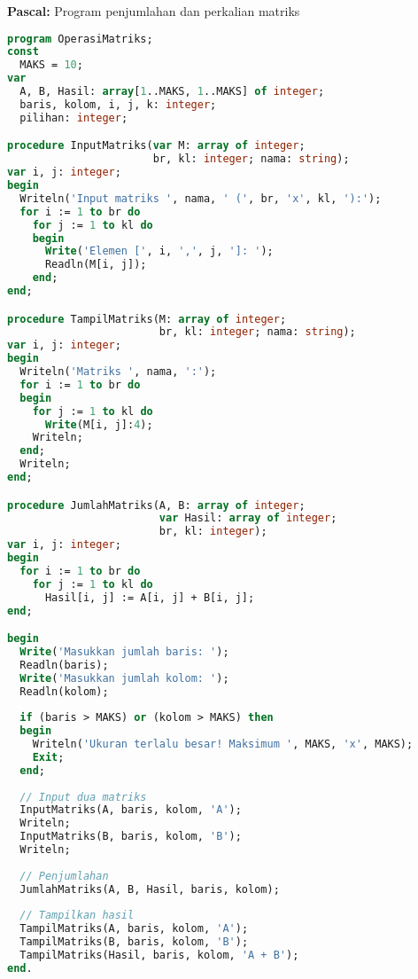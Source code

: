 \documentclass[../main.tex]{subfiles}
\begin{document}
\textbf{Pascal:} Program penjumlahan dan perkalian matriks
\begin{lstlisting}[language=Pascal, caption={Program operasi matriks di Pascal}]
program OperasiMatriks;
const
  MAKS = 10;
var
  A, B, Hasil: array[1..MAKS, 1..MAKS] of integer;
  baris, kolom, i, j, k: integer;
  pilihan: integer;

procedure InputMatriks(var M: array of integer; 
                       br, kl: integer; nama: string);
var i, j: integer;
begin
  Writeln('Input matriks ', nama, ' (', br, 'x', kl, '):');
  for i := 1 to br do
    for j := 1 to kl do
    begin
      Write('Elemen [', i, ',', j, ']: ');
      Readln(M[i, j]);
    end;
end;

procedure TampilMatriks(M: array of integer; 
                        br, kl: integer; nama: string);
var i, j: integer;
begin
  Writeln('Matriks ', nama, ':');
  for i := 1 to br do
  begin
    for j := 1 to kl do
      Write(M[i, j]:4);
    Writeln;
  end;
  Writeln;
end;

procedure JumlahMatriks(A, B: array of integer;
                        var Hasil: array of integer;
                        br, kl: integer);
var i, j: integer;
begin
  for i := 1 to br do
    for j := 1 to kl do
      Hasil[i, j] := A[i, j] + B[i, j];
end;

begin
  Write('Masukkan jumlah baris: ');
  Readln(baris);
  Write('Masukkan jumlah kolom: ');
  Readln(kolom);
  
  if (baris > MAKS) or (kolom > MAKS) then
  begin
    Writeln('Ukuran terlalu besar! Maksimum ', MAKS, 'x', MAKS);
    Exit;
  end;
  
  // Input dua matriks
  InputMatriks(A, baris, kolom, 'A');
  Writeln;
  InputMatriks(B, baris, kolom, 'B');
  Writeln;
  
  // Penjumlahan
  JumlahMatriks(A, B, Hasil, baris, kolom);
  
  // Tampilkan hasil
  TampilMatriks(A, baris, kolom, 'A');
  TampilMatriks(B, baris, kolom, 'B');
  TampilMatriks(Hasil, baris, kolom, 'A + B');
end.
\end{lstlisting}
\end{document}
